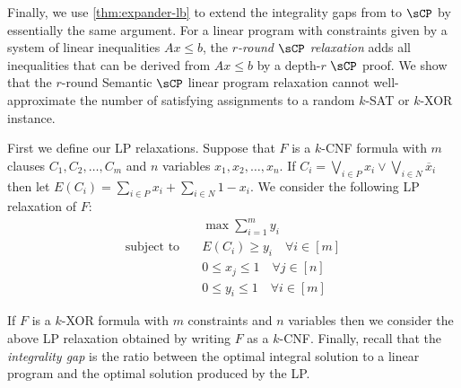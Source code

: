 Finally, we use \autoref{thm:expander-lb} to extend the integrality gaps from \cite{BGHMP06} to $\sCP$ by essentially the same argument. 
For a linear program with constraints given by a system of linear inequalities $Ax \leq b$, the \emph{$r$-round $\sCP$ relaxation} adds all inequalities that can be derived from $Ax \leq b$ by a depth-$r$ $\sCP$ proof.
We show that the $r$-round Semantic $\sCP$ linear program relaxation cannot well-approximate the number of satisfying assignments to a random $k$-SAT or $k$-XOR instance. 

First we define our LP relaxations.
Suppose that $F$ is a $k$-CNF formula with $m$ clauses $C_1, C_2, \ldots, C_m$ and $n$ variables $x_1, x_2, \ldots, x_n$.
If $C_i = \bigvee_{i \in P} x_i \vee \bigvee_{i \in N} \overline x_i$ then let $E(C_i) = \sum_{i \in P} x_i + \sum_{i \in N} 1-x_i$.
We consider the following LP relaxation of $F$:
\begin{align*}
	& \max \sum_{i=1}^m y_i \\
	\text{subject to}\quad & E(C_i) \geq y_i \quad \forall i \in [m]\\
	& 0 \leq x_j \leq 1 \quad \forall j \in [n] \\
	& 0 \leq y_i \leq 1 \quad \forall i \in [m]
\end{align*}

If $F$ is a $k$-XOR formula with $m$ constraints and $n$ variables then we consider the above LP relaxation obtained by writing $F$ as a $k$-CNF.
Finally, recall that the \emph{integrality gap} is the ratio between the optimal integral solution to a linear program and the optimal solution produced by the LP. 

